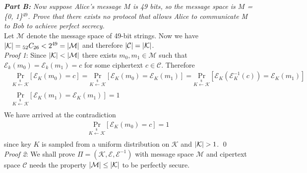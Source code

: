 \documentclass[12pt]{article}
\DeclarePairedDelimiter \abs{\lvert}{\rvert}%
\theoremstyle{remark}
\begin{document}
\textit{\textbf{Part B:} Now suppose Alice's message $M$ is 49 bits, so the message space is $M$ = \{0, 1\}$^{49}$. Prove that there exists no protocol that allows Alice to communicate M to Bob to achieve perfect secrecy.} \\

Let $\mathcal{M}$ denote the message space of 49-bit strings. Now we have $\abs{\mathcal{K}} = {}_{52}C_{26} < 2^{49} = \abs{\mathcal{M}}$ and therefore $\abs{\mathcal{C}} = \abs{\mathcal{K}}$.  \\

\textit{Proof 1}: Since $\abs{\mathcal{K}} < \abs{\mathcal{M}}$ there exists $m_0, m_1 \in \mathcal{M}$ such that $\mathcal{E}_k(m_0) = \mathcal{E}_k(m_1) = c$ for some ciphertext $c \in \mathcal{C}$. Therefore 
\begin{align}
	& \underset{K \xleftarrow[]{\$} \mathcal{K}}{\text{Pr}}[\mathcal{E}_K(m_0) = c] =
	\underset{K \xleftarrow[]{\$} \mathcal{K}}{\text{Pr}}[\mathcal{E}_K(m_0) = \mathcal{E}_K(m_1)] = 
	\underset{K \xleftarrow[]{\$} \mathcal{K}}{\text{Pr}}[\mathcal{E}_K(\mathcal{E}_K^{-1}(c)) = \mathcal{E}_K(m_1)] \\
	& \underset{K \xleftarrow[]{\$} \mathcal{K}}{\text{Pr}}[\mathcal{E}_K(m_1) = \mathcal{E}_K(m_1)] = 1
\end{align}
We have arrived at the contradiction
\begin{align}
	\underset{K \xleftarrow[]{\$} \mathcal{K}}{\text{Pr}}[\mathcal{E}_K(m_0) = c] = 1
\end{align}
since key $K$ is sampled from a uniform distribution on $\mathcal{K}$ and $\abs{\mathcal{K}} > 1$. \qed \\ 

\textit{Proof 2}: We shall prove $\Pi = (\mathcal{K}, \mathcal{E}, \mathcal{E}^{-1})$ with message space $\mathcal{M}$ and cipertext space $\mathcal{C}$ needs the property $\abs{\mathcal{M}} \leq \abs{\mathcal{K}}$ to be perfectly secure. \\ 
\end{document}
